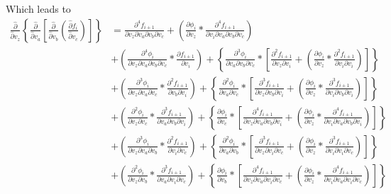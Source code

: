 \documentclass[12pt,letter]{article}
\begin{document}
	Which leads to
	\begin{equation}
	\begin{split}
	\frac{\hat{\partial}}{\hat{\partial} v_z}\left\{\frac{\hat{\partial}}{\hat{\partial} v_a}\left[
	\frac{\hat{\partial}}{\hat{\partial} v_b}\left(\frac{\hat{\partial} f_i}{\hat{\partial} v_c}\right)\right]\right\}
	&= 
	\frac{\partial^4 f_{i+1}}{\partial v_z \partial v_a \partial v_b \partial v_c} +
	\left(\frac{\partial \phi_i}{\partial v_z} * \frac{\partial^4 f_{i+1}}{\partial v_i \partial v_a \partial v_b \partial v_c}\right)
	\\
	&+
	\left(\frac{\partial^4 \phi_i}{\partial v_z \partial v_a \partial v_b \partial v_c} * \frac{\partial f_{i+1}}{\partial v_i}\right) + \left\{\frac{\partial^3 \phi_i}{\partial v_a \partial v_b \partial v_c} * \left[\frac{\partial^2 f_{i+1}}{\partial v_z \partial v_i} + \left(\frac{\partial \phi_i}{\partial v_z} * \frac{\partial^2 f_{i+1}}{\partial v_i \partial v_i}\right)\right]\right\}
	\\
	&+
	\left(\frac{\partial^3 \phi_i}{\partial v_z \partial v_a \partial v_c} * \frac{\partial^2 f_{i+1}}{\partial v_b \partial v_i}\right) + \left\{\frac{\partial^2 \phi_i}{\partial v_a \partial v_c} * \left[\frac{\partial^3 f_{i+1}}{\partial v_z \partial v_b \partial v_i} + \left(\frac{\partial \phi_i}{\partial v_z} * \frac{\partial^3 f_{i+1}}{\partial v_i \partial v_b \partial v_i}\right)\right]\right\}
	\\
	&+
	\left(\frac{\partial^2 \phi_i}{\partial v_z \partial v_c} * \frac{\partial^3 f_{i+1}}{\partial v_a \partial v_b \partial v_i}\right) + \left\{\frac{\partial \phi_i}{\partial v_c} * \left[\frac{\partial^4 f_{i+1}}{\partial v_z \partial v_a \partial v_b \partial v_i} + \left(\frac{\partial \phi_i}{\partial v_z} * \frac{\partial^4 f_{i+1}}{\partial v_i \partial v_a \partial v_b \partial v_i}\right)\right]\right\}
	\\
	&+
	\left(\frac{\partial^3 \phi_i}{\partial v_z \partial v_a \partial v_b} * \frac{\partial^2 f_{i+1}}{\partial v_i \partial v_c}\right) + \left\{\frac{\partial^2 \phi_i}{\partial v_a \partial v_b} * \left[\frac{\partial^3 f_{i+1}}{\partial v_z \partial v_i \partial v_c} + \left(\frac{\partial \phi_i}{\partial v_z} * \frac{\partial^3 f_{i+1}}{\partial v_i \partial v_i \partial v_c}\right)\right]\right\}
	\\
	&+
	\left(\frac{\partial^2 \phi_i}{\partial v_z \partial v_b} * \frac{\partial^3 f_{i+1}}{\partial v_a \partial v_i \partial v_c}\right) + \left\{\frac{\partial \phi_i}{\partial v_b} * \left[\frac{\partial^4 f_{i+1}}{\partial v_z \partial v_a \partial v_i \partial v_c} + \left(\frac{\partial \phi_i}{\partial v_z} * \frac{\partial^4 f_{i+1}}{\partial v_i \partial v_a \partial v_i \partial v_c}\right)\right]\right\}

\end{split}
\end{equation}
\end{document}
